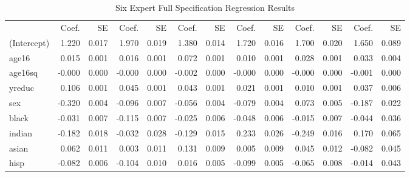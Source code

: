 \documentclass[12pt]{article}
\begin{document}
\begin{landscape}
\begin{table} \centering
  \caption{Six Expert Full Specification Regression Results}
    \begin{threeparttable}
      {\footnotesize
      \begin{tabular}[l]{l r r r r r r r r r r r r}
\cmidrule{1-13}  
                  &  Coef.  &  SE   &   Coef. &  SE  &   Coef.  &  SE   &    Coef. &   SE  &   Coef.  &  SE     &  Coef.   &   SE  \\
\cmidrule(l){2-3}  \cmidrule(l){4-5}  \cmidrule(l){6-7}   \cmidrule(l){8-9}  \cmidrule(l){10-11}  \cmidrule(l){12-13}
(Intercept)       &     1.220	 &    0.017	  &      1.970 &    0.019	 &      1.380	 &    0.014   &       1.720	&     0.016	 &      1.700	 &    0.020	    &     1.650	  &     0.089  \\
age16             &     0.015	 &    0.001	  &      0.016 &    0.001	 &      0.072	 &    0.001   &       0.010	&     0.001	 &      0.028	 &    0.001	    &     0.033	  &     0.004  \\
age16sq           &    -0.000	 &    0.000	  &     -0.000 &    0.000	 &     -0.002	 &    0.000   &      -0.000	&     0.000	 &     -0.000	 &    0.000	    &    -0.001	  &     0.000  \\
yreduc            &     0.106	 &    0.001	  &      0.045 &    0.001	 &      0.043	 &    0.001   &       0.021	&     0.001	 &      0.010	 &    0.001	    &     0.037	  &     0.006  \\
sex               &    -0.320	 &    0.004	  &     -0.096 &    0.007	 &     -0.056	 &    0.004   &      -0.079	&     0.004	 &      0.073	 &    0.005	    &    -0.187	  &     0.022  \\
black             &    -0.031	 &    0.007	  &     -0.115 &    0.007	 &     -0.025	 &    0.006   &      -0.048	&     0.006	 &     -0.015	 &    0.007	    &    -0.044	  &     0.036  \\
indian            &    -0.182	 &    0.018	  &     -0.032 &    0.028	 &     -0.129	 &    0.015   &       0.233	&     0.026	 &     -0.249	 &    0.016	    &     0.170	  &     0.065  \\
asian             &     0.062	 &    0.011	  &      0.003 &    0.011	 &      0.131	 &    0.009   &       0.005	&     0.009	 &      0.045	 &    0.012	    &    -0.082	  &     0.045  \\
hisp              &    -0.082	 &    0.006	  &     -0.104 &    0.010	 &      0.016	 &    0.005   &      -0.099	&     0.005	 &     -0.065	 &    0.008	    &    -0.014	  &     0.043  \\

\end{tabular}}
\end{threeparttable}
\end{table}
\end{landscape}
\end{document}
